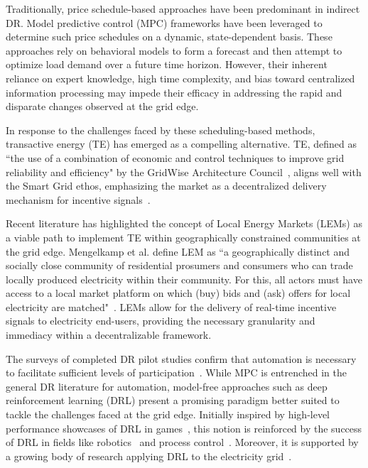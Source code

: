 \documentclass[preprint, 12pt]{elsarticle}
\begin{document}
Traditionally, price schedule-based approaches have been predominant in indirect DR. Model predictive control (MPC) frameworks have been leveraged to determine such price schedules on a dynamic, state-dependent basis. These approaches rely on behavioral models to form a forecast and then attempt to optimize load demand over a future time horizon. However, their inherent reliance on expert knowledge, high time complexity, and bias toward centralized information processing may impede their efficacy in addressing the rapid and disparate changes observed at the grid edge.

In response to the challenges faced by these scheduling-based methods, transactive energy (TE) has emerged as a compelling alternative. TE, defined as ``the use of a combination of economic and control techniques to improve grid reliability and efficiency" by the GridWise Architecture Council~\cite{GridWise}, aligns well with the Smart Grid ethos, emphasizing the market as a decentralized delivery mechanism for incentive signals~\cite{CHEN2017}.

Recent literature has highlighted the concept of Local Energy Markets (LEMs) as a viable path to implement TE within geographically constrained communities at the grid edge. Mengelkamp et al. define LEM as ``a geographically distinct and socially close community of residential prosumers and consumers who can trade locally produced electricity within their community. For this, all actors must have access to a local market platform on which (buy) bids and (ask) offers for local electricity are matched"~\cite{Mengelkamp2019Review}. LEMs allow for the delivery of real-time incentive signals to electricity end-users, providing the necessary granularity and immediacy within a decentralizable framework.

The surveys of completed DR pilot studies confirm that automation is necessary to facilitate sufficient levels of participation~\cite{CHEN2017, FedEnergyRegulatoryCommission_DRReport, Tushar_LEM_Review}. While MPC is entrenched in the general DR literature for automation, model-free approaches such as deep reinforcement learning (DRL) present a promising paradigm better suited to tackle the challenges faced at the grid edge. Initially inspired by high-level performance showcases of DRL in games~\cite{DQN, Alpha0, OpenAi5}, this notion is reinforced by the success of DRL in fields like robotics~\cite{DRL_in_ROBOTICS} and process control~\cite{DRL_in_ProcessControl}. Moreover, it is supported by a growing body of research applying DRL to the electricity grid~\cite{VCReview, perera2021_DRL_InEnergy, cao2020_DRLInPower_Review}. 
\end{document}
